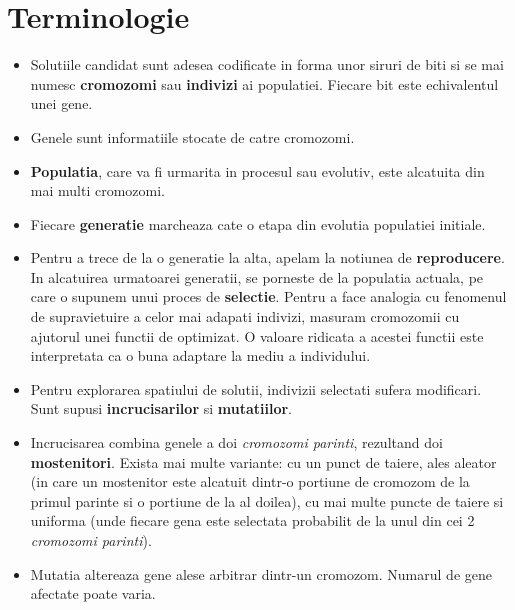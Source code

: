 \section{Terminologie}

\begin{itemize}
	
	\item Solutiile candidat sunt adesea codificate in forma unor siruri de biti si se mai numesc \textbf{cromozomi} sau \textbf{indivizi} ai populatiei. Fiecare bit este echivalentul unei gene.
	
	\item Genele sunt informatiile stocate de catre cromozomi.
	
	\item \textbf{Populatia}, care va fi urmarita in procesul sau evolutiv, este alcatuita din mai multi cromozomi.
	
	\item Fiecare \textbf{generatie} marcheaza cate o etapa din evolutia populatiei initiale.
	
	\item Pentru a trece de la o generatie la alta, apelam la notiunea de \textbf{reproducere}. In alcatuirea urmatoarei generatii, se porneste de la populatia actuala, pe care o supunem unui proces de \textbf{selectie}. Pentru a face analogia cu fenomenul de supravietuire a celor mai adapati indivizi, masuram cromozomii cu ajutorul unei functii de optimizat. O valoare ridicata a acestei functii este interpretata ca o buna adaptare la mediu a individului. 
	
	\item Pentru explorarea spatiului de solutii, indivizii selectati sufera modificari. Sunt supusi \textbf{incrucisarilor} si \textbf{mutatiilor}.
	
	\item Incrucisarea combina genele a doi \textit{cromozomi parinti}, rezultand doi \textbf{mostenitori}. Exista mai multe variante: cu un punct de taiere, ales aleator (in care un mostenitor este alcatuit dintr-o portiune de cromozom de la primul parinte si o portiune de la al doilea), cu mai multe puncte de taiere si uniforma (unde fiecare gena este selectata probabilit de la unul din cei 2 \textit{cromozomi parinti}).
	
	\item Mutatia altereaza gene alese arbitrar dintr-un cromozom. Numarul de gene afectate poate varia.
	
\end{itemize}

